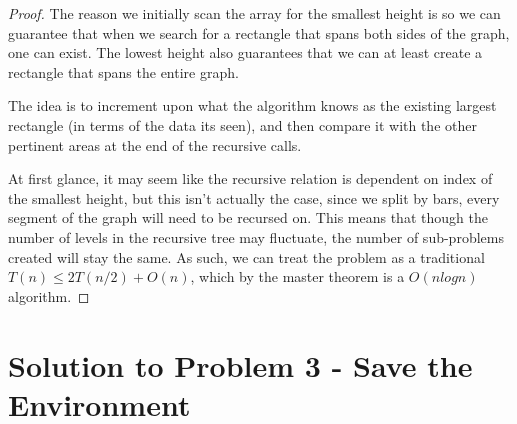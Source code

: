 \documentclass[11pt]{article}
\begin{document}
\begin{proof}
The reason we initially scan the array for the smallest height is so we can guarantee that when we search for a rectangle that spans both sides of the graph, one can exist. The lowest height also guarantees that we can at least create a rectangle that spans the entire graph.

The idea is to increment upon what the algorithm knows as the existing largest rectangle (in terms of the data its seen), and then compare it with the other pertinent areas at the end of the recursive calls.

At first glance, it may seem like the recursive relation is dependent on index of the smallest height, but this isn't actually the case, since we split by bars, every segment of the graph will need to be recursed on. This means that though the number of levels in the recursive tree may fluctuate, the number of sub-problems created will stay the same. As such, we can treat the problem as a traditional $T(n) \leq 2T(n/2) + O(n)$, which by the master theorem is a $O(nlogn)$ algorithm.
\end{proof}

\newpage

\section*{Solution to Problem 3 - Save the Environment}
\end{document}
